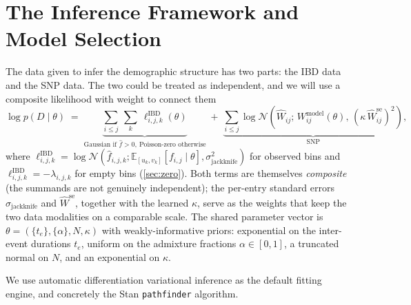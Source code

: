 \documentclass[12pt]{article}
\theoremstyle{definition}
\theoremstyle{definition}
\theoremstyle{lemma}
\theoremstyle{remark}
\theoremstyle{definition}
\begin{document}
\section{The Inference Framework and Model Selection}\label{sec:framework}
The data given to infer the demographic structure has two parts: the IBD data and the SNP data. The two could be treated as independent, and we will use a composite likelihood with weight to connect them
\[
  \log p(D\mid\theta) \;=\;
  \underbrace{\sum_{i\le j}\ \sum_{k}\ \ell^{\text{IBD}}_{i,j,k}(\theta)}_{\text{Gaussian if }\hat f>0,\ \text{Poisson-zero otherwise}}
  \;+\;
  \underbrace{\sum_{i\le j}\log\mathcal{N}\!\left(\hat W_{ij};\,W^{\text{model}}_{ij}(\theta),\,(\kappa\,\hat W^{\text{se}}_{ij})^2\right)}_{\text{SNP}} ,
\]
where
$\ell^{\text{IBD}}_{i,j,k}=\log\mathcal{N}(\hat f_{i,j,k};\mathbb{E}_{[u_k,v_k]}[f_{i,j}\mid\theta],\sigma^2_{\text{jackknife}})$
for observed bins and $\ell^{\text{IBD}}_{i,j,k}=-\lambda_{i,j,k}$ for empty bins
(\cref{sec:zero}). Both terms are themselves \emph{composite} (the summands are not
genuinely independent); the per-entry standard errors $\sigma_{\text{jackknife}}$
and $\hat W^{\text{se}}$, together with the learned $\kappa$, serve as the weights
that keep the two data modalities on a comparable scale. The shared parameter
vector is $\theta=(\{t_e\},\{\alpha\},N,\kappa)$ with weakly-informative priors:
exponential on the inter-event durations $t_e$, uniform on the admixture
fractions $\alpha\in[0,1]$, a truncated normal on $N$, and an exponential on
$\kappa$.

We use automatic differentiation variational inference as the default
fitting engine, and concretely the Stan \texttt{pathfinder} algorithm.
\end{document}
